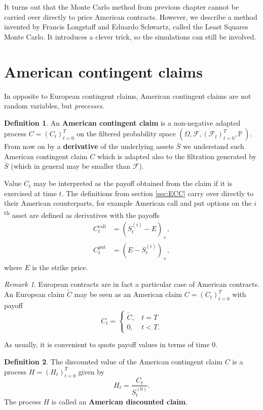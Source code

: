 \documentclass[a4paper,11pt, twoside]{book}
\theoremstyle{definition}
\newtheorem{mydef}{Definition}[chapter]
\theoremstyle{remark}
\newtheorem{remark}{Remark}[chapter]
\newcounter{example}[chapter]
\def\P{{\mathbb{P}}\,}
\def\Sa{\bar{S}}
\begin{document}
It turns out that the Monte Carlo method from previous chapter cannot be carried over directly to price American contracts. However, we describe a method invented by Francis Longstaff and Eduardo Schwartz, called the Least Squares Monte Carlo. It introduces a clever trick, so the simulations can still be involved. 

\section{American contingent claims}
In opposite to European contingent claims, American contingent claims are not random variables, but \emph{processes}.
\begin{mydef}
 \label{def:cc_am}
 An \textbf{American contingent claim} is a non-negative adapted process $C = (C_t)_{t=0}^T$ on the filtered probability space $(\Omega, \mathcal{F}, (\mathcal{F}_t)_{t=0}^T, \P)$.
From now on by a \textbf{derivative} of the underlying assets $\Sa$ we understand such American contingent claim $C$ which is adapted also to the filtration generated by $\Sa$ (which in general may be smaller than $\mathcal{F}$).
\end{mydef}
Value $C_t$ may be interpreted as the payoff obtained from the claim if it is exercised at time $t$. The definitions from section \ref{sec:ECC} carry over directly to their American counterparts, for example American call and put options on the $i$\textsuperscript{th} asset are defined as derivatives with the payoffs
\begin{equation*}
 \begin{split}
  C^{\text{call}}_t &= (S^{(i)}_t - E)_+, \\
  C^{\text{put}}_t &= (E - S^{(i)}_t)_+,
 \end{split}
\end{equation*}
where $E$ is the strike price.
\begin{remark}
 European contracts are in fact  a particular case of American contracts. An European claim $\tilde{C}$ may be seen as an American claim $C = (C_t)_{t=0}^T$ with payoff
 \[ C_t = \begin{cases}
         \tilde{C},\ \ \ \ t = T \\
         0,\ \ \ \ \ t < T.
        \end{cases}
        \]
\end{remark}

As usually, it is convenient to quote payoff values in terms of time 0.
\begin{mydef}
 The discounted value of the American contingent claim $C$ is a process $H = (H_t)_{t=0}^T$ given by
 \begin{equation*}
  H_t = \frac{C_t}{S^{(0)}_t}.
 \end{equation*}
 The process $H$ is called an \textbf{American discounted claim}.
\end{mydef}
\end{document}
